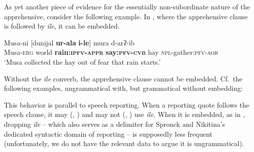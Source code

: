 \documentclass[output=paper,colorlinks,citecolor=brown]{langscibook}
\begin{document}
As yet another piece of evidence for the essentially non-subordinate nature of the apprehensive, consider the following example. In , where the apprehensive clause is followed by \textit{ile}, it can be embedded.

\ea \label{ex:DD56}
\gll Musa-ni \textup{[}dunijal \textbf{ur-ala} \textbf{i-le}\textup{]} mura d-arʔ-ib \\
Musa-\textsc{erg} world \textbf{rain:\textsc{ipfv-appr}} \textbf{say:\textsc{pfv-cvb}} hay \textsc{npl}-gather:\textsc{pfv-aor} \\
\glt `Musa collected the hay out of fear that rain starts.'
\z

 Without the \textit{ile} converb, the apprehensive clause cannot be embedded. Cf.\ the following examples, ungrammatical with, but grammatical without embedding:


\ea \label{ex:DD57}
\z
\z

\ea \label{ex:DD58}
\z
\z

 This behavior is parallel to speech reporting. When a reporting quote follows the speech clause, it may (, ) and may not (, ) use \textit{ile.} When it is embedded, as in , dropping \textit{ile} -- which also serves as a delimiter for Spronck and Nikitina's dedicated syntactic domain of reporting -- is supposedly less frequent (unfortunately, we do not have the relevant data to argue it is ungrammatical).  
\end{document}
